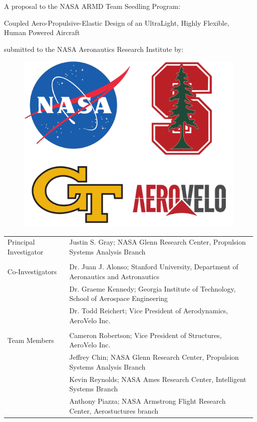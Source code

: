 \documentclass[]{aiaa-tc}
\begin{document}

  \vspace{4em}
  \begin{center}
    A proposal to the NASA ARMD Team Seedling Program: 
    \vspace{2em}

    {\Huge Coupled Aero­-Propulsive-Elastic Design of an Ultra­Light, Highly Flexible, Human Powered Aircraft}

    \vspace{2em}
    submitted to the NASA Aeronautics Research Institute by: 

    \vspace{3em}
    \begin{figure}
        \centering
        \includegraphics[width=.5\textwidth]{images/seedling_logos}
    \end{figure}
    \vspace{3em}


  \end{center}


  \begin{tabular}{l l}
    Principal Investigator & Justin S. Gray; NASA Glenn Research Center, Propulsion Systems Analysis Branch \\ 
    & \\
    Co-Investigators & Dr. Juan J. Alonso; Stanford University, Department of Aeronautics and Astronautics \\
                     & Dr. Graeme Kennedy; Georgia Institute of Technology, School of Aerospace Engineering \\ 
                     & Dr. Todd Reichert; Vice President of Aerodynamics, AeroVelo Inc. \\
    & \\ 
    Team Members & Cameron Robertson; Vice President of Structures, AeroVelo Inc. \\ 
                 & Jeffrey Chin; NASA Glenn Research Center, Propulsion Systems Analysis Branch \\
                 & Kevin Reynolds; NASA Ames Research Center, Intelligent Systems Branch \\
                 & Anthony Piazza; NASA Armstrong Flight Research Center, Aerostuctures branch \\
  \end{tabular}
\end{document}
